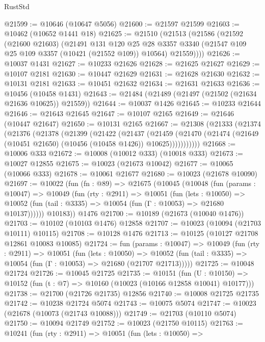 \begin{lexlean}{RustStd}
\begin{coremodule}
@21599 := @10646 (@10647 @5056)
@21600 := @21597 @21599
@21603 := @10462 (@10652 @1441 @18)
@21625 := @21510
    (@21513
      (@21586
        (@21592
          (@21600 @21603)
          (@21491
            @131
            @120
            @25
            @28
            @3357
            @3340
            (@21547 @109 @25 @109 @3357 (@10421 (@21552 @109)) @10564)
            @21559))))
@21626 := @10037 @1431
@21627 := @10233 @21626
@21628 := @21625 @21627
@21629 := @10107 @2181
@21630 := @10447 @21629
@21631 := @21628 @21630
@21632 := @10131 @2181
@21633 := @10451 @21632
@21634 := @21631 @21633
@21636 := @10456 (@10458 @1431)
@21643 := @21484 (@21489 (@21497 (@21502 (@21634 @21636 @10625)) @21559))
@21644 := @10037 @1426
@21645 := @10233 @21644
@21646 := @21643 @21645
@21647 := @10107 @2165
@21649 := @21646 (@10447 @21647)
@21650 := @10131 @2165
@21667 := @21308
    (@21333
      (@21374
        (@21376
          (@21378
            (@21399
              (@21422
                (@21437
                  (@21459
                    (@21470
                      (@21474 (@21649 (@10451 @21650) (@10456 (@10458 @1426)) @10625)))))))))))
@21668 := @10006 @333
@21672 := @10008 (@10012 @333) (@10018 @333)
@21673 := @10027 @12855
@21675 := @10023 (@21673 @10042)
@21677 := @10065 (@10066 @333)
@21678 := @10061 @21677
@21680 := @10023 (@21678 @10090)
@21697 := @10022
    (fun (fn : @89) =>
    @21675
      (@10045
        (@10048
          (fun (params : @10047) =>
          @10049
            (fun (rty : @2911) =>
            @10051
              (fun (lets : @10050) =>
              @10052 (fun (tail : @3335) => @10054 (fun (Γ : @10053) => @21680 @10137))))))
        @10183))
    @1476
@21700 := @10189 (@21673 (@10040 @1476))
@21703 := @10102 (@10103 @1476) @12858
@21707 := @10023 (@10094 (@21703 @10111) @10115)
@21708 := @10128 @1476
@21713 := @10125 (@10127 @21708 @12861 @10083 @10085)
@21724 := fun (params : @10047) =>
  @10049
    (fun (rty : @2911) =>
    @10051
      (fun (lets : @10050) =>
      @10052 (fun (tail : @3335) => @10054 (fun (Γ : @10053) => @21680 (@21707 @21713)))))
@21725 := @10048 @21724
@21726 := @10045 @21725
@21735 := @10151
    (fun (U : @10150) => @10152 (fun (t : @7) => @10160 (@10023 (@10166 @12858 @10041) @10177)))
@21738 := @21700 (@21726 @21735) @12856
@21740 := @10008 @21725 @21735
@21742 := @10238 @21724 @5074
@21743 := @10075 @5074
@21747 := @10023 (@21678 (@10073 (@21743 @10088)))
@21749 := @21703 (@10110 @5074)
@21750 := @10094 @21749
@21752 := @10023 (@21750 @10115)
@21763 := @10241
    (fun (rty : @2911) =>
    @10051
      (fun (lets : @10050) =>

\end{coremodule}
\end{lexlean}
